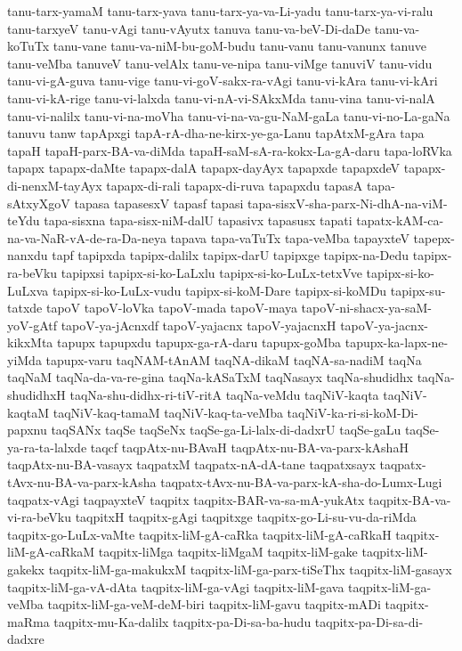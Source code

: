 {tanu-tarx-yamaM
tanu-tarx-yava
tanu-tarx-ya-va-Li-yadu
tanu-tarx-ya-vi-ralu
tanu-tarxyeV
tanu-vAgi
tanu-vAyutx
tanuva
tanu-va-beV-Di-daDe
tanu-va-koTuTx
tanu-vane
tanu-va-niM-bu-goM-budu
tanu-vanu
tanu-vanunx
tanuve
tanu-veMba
tanuveV
tanu-velAlx
tanu-ve-nipa
tanu-viMge
tanuviV
tanu-vidu
tanu-vi-gA-guva
tanu-vige
tanu-vi-goV-sakx-ra-vAgi
tanu-vi-kAra
tanu-vi-kAri
tanu-vi-kA-rige
tanu-vi-lalxda
tanu-vi-nA-vi-SAkxMda
tanu-vina
tanu-vi-nalA
tanu-vi-nalilx
tanu-vi-na-moVha
tanu-vi-na-va-gu-NaM-gaLa
tanu-vi-no-La-gaNa
tanuvu
tanw
tapApxgi
tapA-rA-dha-ne-kirx-ye-ga-Lanu
tapAtxM-gAra
tapa
tapaH
tapaH-parx-BA-va-diMda
tapaH-saM-sA-ra-kokx-La-gA-daru
tapa-loRVka
tapapx
tapapx-daMte
tapapx-dalA
tapapx-dayAyx
tapapxde
tapapxdeV
tapapx-di-nenxM-tayAyx
tapapx-di-rali
tapapx-di-ruva
tapapxdu
tapasA
tapa-sAtxyXgoV
tapasa
tapasesxV
tapasf
tapasi
tapa-sisxV-sha-parx-Ni-dhA-na-viM-teYdu
tapa-sisxna
tapa-sisx-niM-dalU
tapasivx
tapasusx
tapati
tapatx-kAM-ca-na-va-NaR-vA-de-ra-Da-neya
tapava
tapa-vaTuTx
tapa-veMba
tapayxteV
tapepx-nanxdu
tapf
tapipxda
tapipx-dalilx
tapipx-darU
tapipxge
tapipx-na-Dedu
tapipx-ra-beVku
tapipxsi
tapipx-si-ko-LaLxlu
tapipx-si-ko-LuLx-tetxVve
tapipx-si-ko-LuLxva
tapipx-si-ko-LuLx-vudu
tapipx-si-koM-Dare
tapipx-si-koMDu
tapipx-su-tatxde
tapoV
tapoV-loVka
tapoV-mada
tapoV-maya
tapoV-ni-shacx-ya-saM-yoV-gAtf
tapoV-ya-jAcnxdf
tapoV-yajacnx
tapoV-yajacnxH
tapoV-ya-jacnx-kikxMta
tapupx
tapupxdu
tapupx-ga-rA-daru
tapupx-goMba
tapupx-ka-lapx-ne-yiMda
tapupx-varu
taqNAM-tAnAM
taqNA-dikaM
taqNA-sa-nadiM
taqNa
taqNaM
taqNa-da-va-re-gina
taqNa-kASaTxM
taqNasayx
taqNa-shudidhx
taqNa-shudidhxH
taqNa-shu-didhx-ri-tiV-ritA
taqNa-veMdu
taqNiV-kaqta
taqNiV-kaqtaM
taqNiV-kaq-tamaM
taqNiV-kaq-ta-veMba
taqNiV-ka-ri-si-koM-Di-papxnu
taqSANx
taqSe
taqSeNx
taqSe-ga-Li-lalx-di-dadxrU
taqSe-gaLu
taqSe-ya-ra-ta-lalxde
taqcf
taqpAtx-nu-BAvaH
taqpAtx-nu-BA-va-parx-kAshaH
taqpAtx-nu-BA-vasayx
taqpatxM
taqpatx-nA-dA-tane
taqpatxsayx
taqpatx-tAvx-nu-BA-va-parx-kAsha
taqpatx-tAvx-nu-BA-va-parx-kA-sha-do-Lumx-Lugi
taqpatx-vAgi
taqpayxteV
taqpitx
taqpitx-BAR-va-sa-mA-yukAtx
taqpitx-BA-va-vi-ra-beVku
taqpitxH
taqpitx-gAgi
taqpitxge
taqpitx-go-Li-su-vu-da-riMda
taqpitx-go-LuLx-vaMte
taqpitx-liM-gA-caRka
taqpitx-liM-gA-caRkaH
taqpitx-liM-gA-caRkaM
taqpitx-liMga
taqpitx-liMgaM
taqpitx-liM-gake
taqpitx-liM-gakekx
taqpitx-liM-ga-makukxM
taqpitx-liM-ga-parx-tiSeThx
taqpitx-liM-gasayx
taqpitx-liM-ga-vA-dAta
taqpitx-liM-ga-vAgi
taqpitx-liM-gava
taqpitx-liM-ga-veMba
taqpitx-liM-ga-veM-deM-biri
taqpitx-liM-gavu
taqpitx-mADi
taqpitx-maRma
taqpitx-mu-Ka-dalilx
taqpitx-pa-Di-sa-ba-hudu
taqpitx-pa-Di-sa-di-dadxre
}
